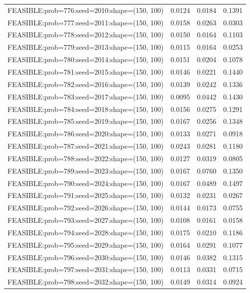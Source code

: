 \begin{longtable}{lccc}
FEASIBLE:prob=776:seed=2010:shape=(150, 100) & 0.0124 & 0.0184 & 0.1391 \\
FEASIBLE:prob=777:seed=2011:shape=(150, 100) & 0.0158 & 0.0263 & 0.0303 \\
FEASIBLE:prob=778:seed=2012:shape=(150, 100) & 0.0150 & 0.0164 & 0.1103 \\
FEASIBLE:prob=779:seed=2013:shape=(150, 100) & 0.0115 & 0.0164 & 0.0253 \\
FEASIBLE:prob=780:seed=2014:shape=(150, 100) & 0.0151 & 0.0204 & 0.1078 \\
FEASIBLE:prob=781:seed=2015:shape=(150, 100) & 0.0146 & 0.0221 & 0.1440 \\
FEASIBLE:prob=782:seed=2016:shape=(150, 100) & 0.0139 & 0.0242 & 0.1336 \\
FEASIBLE:prob=783:seed=2017:shape=(150, 100) & 0.0095 & 0.0442 & 0.1430 \\
FEASIBLE:prob=784:seed=2018:shape=(150, 100) & 0.0156 & 0.0275 & 0.1291 \\
FEASIBLE:prob=785:seed=2019:shape=(150, 100) & 0.0167 & 0.0256 & 0.1348 \\
FEASIBLE:prob=786:seed=2020:shape=(150, 100) & 0.0133 & 0.0271 & 0.0918 \\
FEASIBLE:prob=787:seed=2021:shape=(150, 100) & 0.0243 & 0.0281 & 0.1180 \\
FEASIBLE:prob=788:seed=2022:shape=(150, 100) & 0.0127 & 0.0319 & 0.0805 \\
FEASIBLE:prob=789:seed=2023:shape=(150, 100) & 0.0167 & 0.0760 & 0.1350 \\
FEASIBLE:prob=790:seed=2024:shape=(150, 100) & 0.0167 & 0.0489 & 0.1497 \\
FEASIBLE:prob=791:seed=2025:shape=(150, 100) & 0.0132 & 0.0231 & 0.0267 \\
FEASIBLE:prob=792:seed=2026:shape=(150, 100) & 0.0144 & 0.0173 & 0.0755 \\
FEASIBLE:prob=793:seed=2027:shape=(150, 100) & 0.0108 & 0.0161 & 0.0158 \\
FEASIBLE:prob=794:seed=2028:shape=(150, 100) & 0.0175 & 0.0210 & 0.1186 \\
FEASIBLE:prob=795:seed=2029:shape=(150, 100) & 0.0164 & 0.0291 & 0.1077 \\
FEASIBLE:prob=796:seed=2030:shape=(150, 100) & 0.0146 & 0.0382 & 0.1315 \\
FEASIBLE:prob=797:seed=2031:shape=(150, 100) & 0.0113 & 0.0331 & 0.0715 \\
FEASIBLE:prob=798:seed=2032:shape=(150, 100) & 0.0149 & 0.0314 & 0.0924 \\

\end{longtable}
